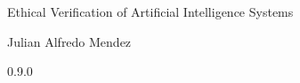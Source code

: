 \documentclass[12pt,a4paper]{book}
\begin{document}
    \begin{center}

        \phantom{H}

        \vspace{80mm}

        {\huge{Ethical Verification of Artificial Intelligence Systems}}

        \vspace{80mm}
        Julian Alfredo Mendez

        \vspace{10mm}
        0.9.0

    \end{center}

    \newpage

    
    
    
    

    
    

    
    
    
    
    

    
    
\end{document}
